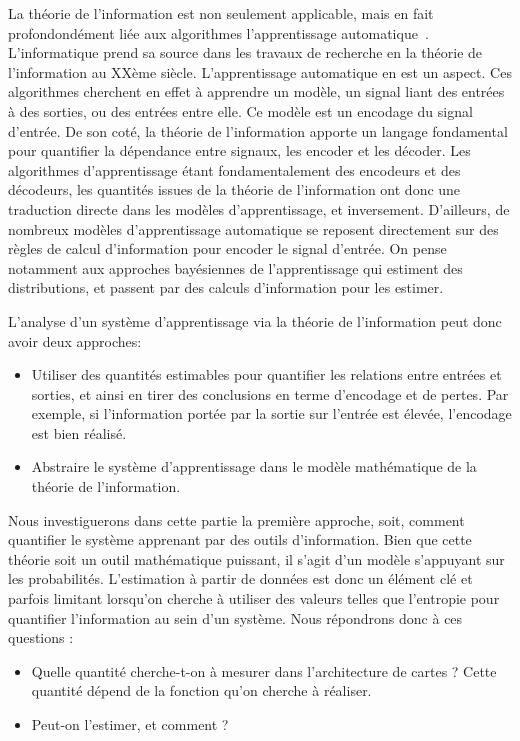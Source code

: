 La théorie de l'information est non seulement applicable, mais en fait profondondément liée aux algorithmes l'apprentissage automatique~\cite{mackay2003information}. L'informatique prend sa source dans les travaux de recherche en la théorie de l'information au XXème siècle. L'apprentissage automatique en est un aspect.
Ces algorithmes cherchent en effet à apprendre un modèle, un signal liant des entrées à des sorties, ou des entrées entre elle. Ce modèle est un encodage du signal d'entrée. 
De son coté, la théorie de l'information apporte un langage fondamental pour quantifier la dépendance entre signaux, les encoder et les décoder. Les algorithmes d'apprentissage étant fondamentalement des encodeurs et des décodeurs, les quantités issues de la théorie de l'information ont donc une traduction directe dans les modèles d'apprentissage, et inversement.
D'ailleurs, de nombreux modèles d'apprentissage automatique se reposent directement sur des règles de calcul d'information pour encoder le signal d'entrée. On pense notamment aux approches bayésiennes de l'apprentissage qui estiment des distributions, et passent par des calculs d'information pour les estimer.
 
L'analyse d'un système d'apprentissage via la théorie de l'information peut donc avoir deux approches: 

\begin{itemize}
\item Utiliser des quantités estimables pour quantifier les relations entre entrées et sorties, et ainsi en tirer des conclusions en terme d'encodage et de pertes. Par exemple, si l'information portée par la sortie sur l'entrée est élevée, l'encodage est bien réalisé.
\item Abstraire le système d'apprentissage dans le modèle mathématique de la théorie de l'information.
\end{itemize}

Nous investiguerons dans cette partie la première approche, soit, comment quantifier le système apprenant par des outils d'information. Bien que cette théorie soit un outil mathématique puissant, il s'agit d'un modèle s'appuyant sur les probabilités. L'estimation à partir de données est donc un élément clé et parfois limitant lorsqu'on cherche à utiliser des valeurs telles que l'entropie pour quantifier l'information au sein d'un système. Nous répondrons donc à ces questions : 
\begin{itemize}
\item Quelle quantité cherche-t-on à mesurer dans l'architecture de cartes ? Cette quantité dépend de la fonction qu'on cherche à réaliser.
\item Peut-on l'estimer, et comment ? 
\end{itemize}

